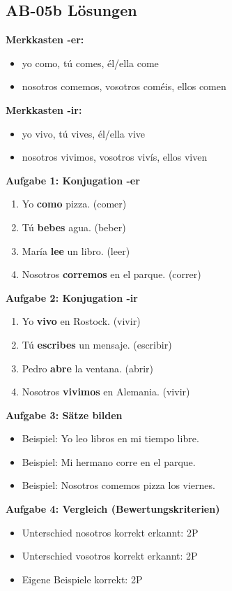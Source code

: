 \documentclass[11pt,a4paper]{article}
\begin{document}
\subsection{AB-05b Lösungen}

\textbf{Merkkasten -er:}
\begin{itemize}
    \item yo como, tú comes, él/ella come
    \item nosotros comemos, vosotros coméis, ellos comen
\end{itemize}

\textbf{Merkkasten -ir:}
\begin{itemize}
    \item yo vivo, tú vives, él/ella vive
    \item nosotros vivimos, vosotros vivís, ellos viven
\end{itemize}

\textbf{Aufgabe 1: Konjugation -er}
\begin{enumerate}[label=\alph*)]
    \item Yo \textbf{como} pizza. (comer)
    \item Tú \textbf{bebes} agua. (beber)
    \item María \textbf{lee} un libro. (leer)
    \item Nosotros \textbf{corremos} en el parque. (correr)
\end{enumerate}

\textbf{Aufgabe 2: Konjugation -ir}
\begin{enumerate}[label=\alph*)]
    \item Yo \textbf{vivo} en Rostock. (vivir)
    \item Tú \textbf{escribes} un mensaje. (escribir)
    \item Pedro \textbf{abre} la ventana. (abrir)
    \item Nosotros \textbf{vivimos} en Alemania. (vivir)
\end{enumerate}

\textbf{Aufgabe 3: Sätze bilden}
\begin{itemize}
    \item Beispiel: Yo leo libros en mi tiempo libre.
    \item Beispiel: Mi hermano corre en el parque.
    \item Beispiel: Nosotros comemos pizza los viernes.
\end{itemize}

\textbf{Aufgabe 4: Vergleich (Bewertungskriterien)}
\begin{itemize}
    \item Unterschied nosotros korrekt erkannt: 2P
    \item Unterschied vosotros korrekt erkannt: 2P
    \item Eigene Beispiele korrekt: 2P
\end{itemize}
\end{document}

